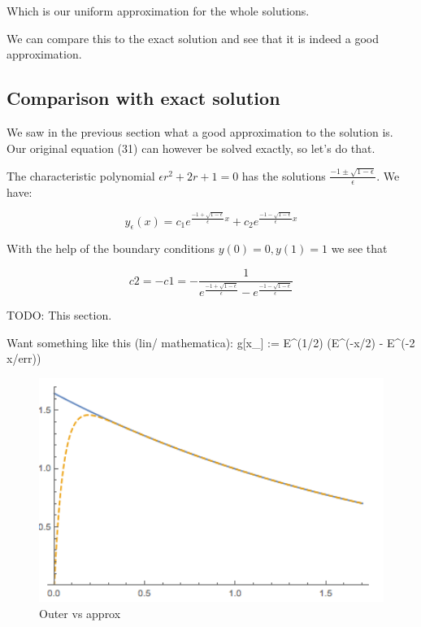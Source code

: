 \documentclass[12pt]{article}
\begin{document}
Which is our uniform approximation for the whole solutions.

We can compare this to the exact solution and see that it is indeed a good
approximation.

\subsection{Comparison with exact solution}

We saw in the previous section what a good approximation to the
solution is. Our original equation (31) can however be solved exactly,
so let's do that.

The characteristic polynomial $\epsilon r^2 +2r + 1 = 0$ has the solutions
$\frac{-1 \pm \sqrt{1-\epsilon}}{\epsilon}$. We have:

\begin{equation}
y_{\epsilon}(x)=c_1 e^{\frac{-1 + \sqrt{1-\epsilon}}{\epsilon} x} + c_2
e^{\frac{-1 - \sqrt{1-\epsilon}}{\epsilon} x}
\end{equation}

With the help of the boundary conditions $y(0)=0, y(1)=1$ we see that

\begin{equation}
  c2 = - c1 = - \frac{1}{e^{\frac{-1 + \sqrt{1-\epsilon}}{\epsilon}}
    - e^{\frac{-1 - \sqrt{1-\epsilon}}{\epsilon}}}
\end{equation}

TODO: This section.

Want something like this (lin/ mathematica): g[x_] := E^(1/2)
(E^(-x/2) - E^(-2 x/err))

\begin{figure}[ht!]
\centering
\includegraphics[width=120mm]
{tmp_ode-outer.png}
\caption{Outer vs approx}
\label{overflow}
\end{figure}
\end{document}
